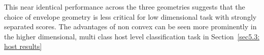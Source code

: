This near identical 
performance across the three geometries suggests that the choice of envelope geometry is less critical for low dimensional task 
with strongly separated scores. 
The advantages of non convex can be seen more prominently in the 
higher dimensional, multi class host level classification task in Section~\ref{sec5.3: host results}




